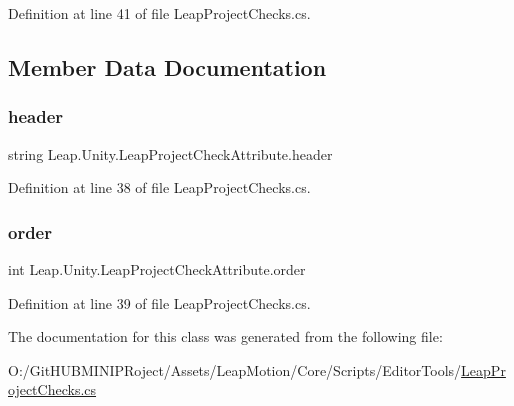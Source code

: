 Definition at line 41 of file Leap\+Project\+Checks.\+cs.



\subsection{Member Data Documentation}
\mbox{\label{class_leap_1_1_unity_1_1_leap_project_check_attribute_a3248d23569bddc48b605c24376cb1be1}} 
\subsubsection{\texorpdfstring{header}{header}}
{\footnotesize\ttfamily string Leap.\+Unity.\+Leap\+Project\+Check\+Attribute.\+header}



Definition at line 38 of file Leap\+Project\+Checks.\+cs.

\mbox{\label{class_leap_1_1_unity_1_1_leap_project_check_attribute_a880d57036d1efe9740568ba2f6418a01}} 
\subsubsection{\texorpdfstring{order}{order}}
{\footnotesize\ttfamily int Leap.\+Unity.\+Leap\+Project\+Check\+Attribute.\+order}



Definition at line 39 of file Leap\+Project\+Checks.\+cs.



The documentation for this class was generated from the following file\+:\begin{DoxyCompactItemize}
\item 
O\+:/\+Git\+H\+U\+B\+M\+I\+N\+I\+P\+Roject/\+Assets/\+Leap\+Motion/\+Core/\+Scripts/\+Editor\+Tools/\mbox{\hyperlink{_leap_project_checks_8cs}{Leap\+Project\+Checks.\+cs}}\end{DoxyCompactItemize}
